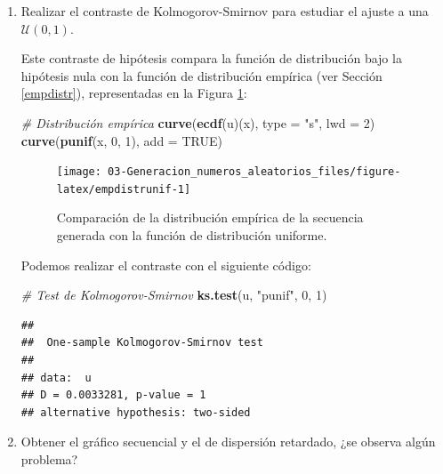 \documentclass[
]{book}
\newenvironment{Shaded}{\begin{snugshade}}{\end{snugshade}}
\newcommand{\CommentTok}[1]{\textcolor[rgb]{0.56,0.35,0.01}{\textit{#1}}}
\newcommand{\DataTypeTok}[1]{\textcolor[rgb]{0.13,0.29,0.53}{#1}}
\newcommand{\DecValTok}[1]{\textcolor[rgb]{0.00,0.00,0.81}{#1}}
\newcommand{\KeywordTok}[1]{\textcolor[rgb]{0.13,0.29,0.53}{\textbf{#1}}}
\newcommand{\NormalTok}[1]{#1}
\newcommand{\OtherTok}[1]{\textcolor[rgb]{0.56,0.35,0.01}{#1}}
\newcommand{\StringTok}[1]{\textcolor[rgb]{0.31,0.60,0.02}{#1}}
\theoremstyle{break}
\theoremstyle{definition}
\theoremstyle{definition}
\theoremstyle{definition}
\theoremstyle{remark}
\begin{document}
\begin{enumerate}
\def\labelenumi{\alph{enumi})}
\item
  Realizar el contraste de Kolmogorov-Smirnov para estudiar el
  ajuste a una \(\mathcal{U}(0,1)\).

  Este contraste de hipótesis compara la función de distribución bajo la hipótesis nula con la función de distribución empírica (ver Sección \ref{empdistr}), representadas en la Figura \ref{fig:empdistrunif}:

\begin{Shaded}
\begin{Highlighting}[]
\CommentTok{# Distribución empírica}
\KeywordTok{curve}\NormalTok{(}\KeywordTok{ecdf}\NormalTok{(u)(x), }\DataTypeTok{type =} \StringTok{"s"}\NormalTok{, }\DataTypeTok{lwd =} \DecValTok{2}\NormalTok{)}
\KeywordTok{curve}\NormalTok{(}\KeywordTok{punif}\NormalTok{(x, }\DecValTok{0}\NormalTok{, }\DecValTok{1}\NormalTok{), }\DataTypeTok{add =} \OtherTok{TRUE}\NormalTok{)}
\end{Highlighting}
\end{Shaded}

  \begin{figure}[!htb]

  {\centering \texttt{[image: 03-Generacion\_numeros\_aleatorios\_files/figure-latex/empdistrunif-1]} 

  }

  \caption{Comparación de la distribución empírica de la secuencia generada con la función de distribución uniforme.}\label{fig:empdistrunif}
  \end{figure}

  Podemos realizar el contraste con el siguiente código:

\begin{Shaded}
\begin{Highlighting}[]
\CommentTok{# Test de Kolmogorov-Smirnov}
\KeywordTok{ks.test}\NormalTok{(u, }\StringTok{"punif"}\NormalTok{, }\DecValTok{0}\NormalTok{, }\DecValTok{1}\NormalTok{)}
\end{Highlighting}
\end{Shaded}

\begin{verbatim}
## 
##  One-sample Kolmogorov-Smirnov test
## 
## data:  u
## D = 0.0033281, p-value = 1
## alternative hypothesis: two-sided
\end{verbatim}
\item
  Obtener el gráfico secuencial y el de dispersión retardado, ¿se
  observa algún problema?


\end{enumerate}
\end{document}

